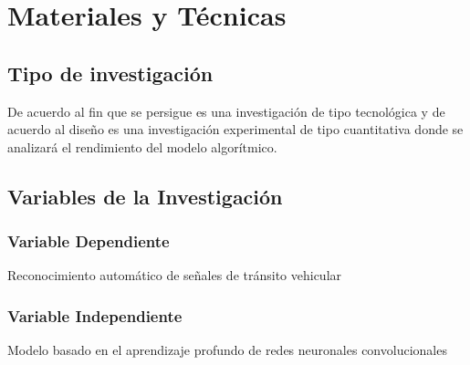 \chapter{Materiales y Técnicas}
\setcounter{page}{16}
\renewcommand{\baselinestretch}{2} %

\section{ Tipo de investigación}
	De acuerdo al fin que se persigue es una investigación de tipo tecnológica y de acuerdo al diseño es una investigación experimental de tipo cuantitativa donde se analizará el rendimiento del modelo algorítmico.

\section{Variables de la Investigación}
		
		\subsection{Variable Dependiente}
		\indent Reconocimiento automático de señales de tránsito vehicular
		\subsection {Variable Independiente}
		\indent Modelo basado en el aprendizaje profundo de redes neuronales convolucionales	
		
